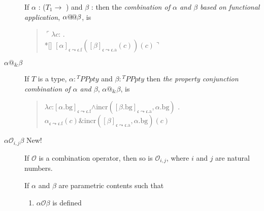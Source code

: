 \begin{description}
  If $\alpha$ : ($T_1\rightarrow$ ) 
                         and $\beta$ : 
                         then the \textit{combination of $\alpha$ and
    $\beta$  based on functional application}, $\alpha\text{@\!@}\beta$, is
  \begin{quote}
    $\ulcorner\lambda c$:
      . \\*[\baselineskip]
      \hspace*{10em}$[\alpha]_{\mathfrak{c}\leadsto\mathfrak{c}.\text{f}}([\beta]_{\mathfrak{c}\leadsto\mathfrak{c}.\text{a}}(c))(c)\urcorner$
    \end{quote}

    \item[\textnormal{$\alpha\text{@}_{\&}\beta$}] \mbox{}

  If $T$ is a type, $\alpha:{^T\textit{PPpty}}$ and
  $\beta:{^T\textit{PPpty}}$ 
  then \textit{the property conjunction
    combination of $\alpha$ and $\beta$}, $\alpha\text{@}_{\&}\beta$,
  is
\begin{quote}
  $\lambda
  c$:$[\alpha.\text{bg}]_{\mathfrak{c}\leadsto\mathfrak{c}.\text{f}}$\d{$\wedge$}$\mathrm{incr}([\beta.\text{bg}]_{\mathfrak{c}\leadsto\mathfrak{c}.\text{a}},\alpha.\text{bg})$
        . $\alpha_{\mathfrak{c}\leadsto\mathfrak{c}.\text{f}}(c)\&\mathrm{incr}([\beta]_{\mathfrak{c}\leadsto\mathfrak{c}.\text{a}},\alpha.\text{bg})(c)$
      \end{quote}

     
    \item[\textnormal{$\alpha\mathcal{O}_{i,j}\beta$} New!] \mbox{}

      If $\mathcal{O}$ is a combination operator, then so is
$\mathcal{O}_{i,j}$, where $i$ and $j$ are natural numbers.

If
$\alpha$ and $\beta$ are parametric contents such that
\begin{enumerate}
\item $\alpha\mathcal{O}\beta$ is defined
  

\end{enumerate}
\end{description}
